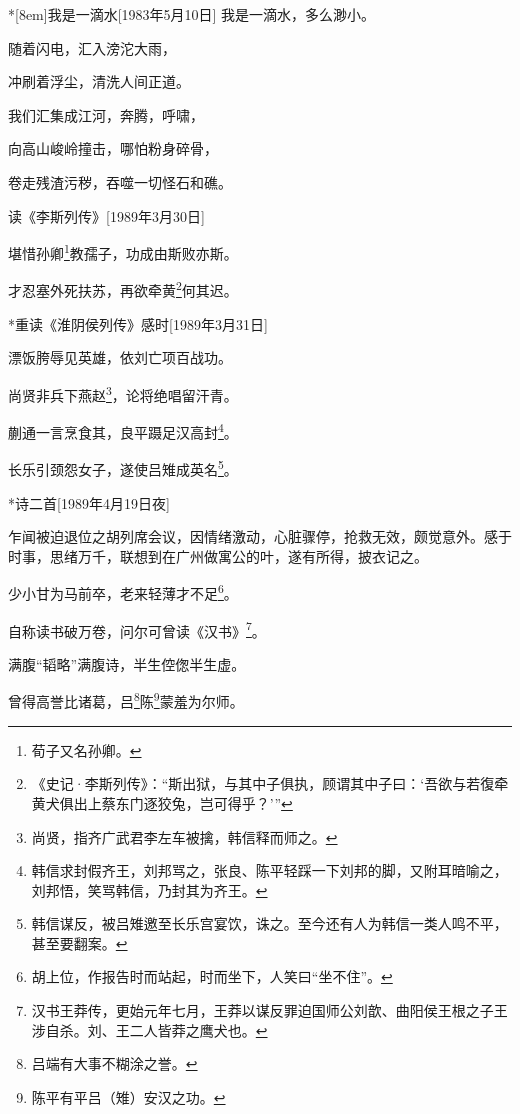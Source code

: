\documentclass[../../dazhuan.tex]{subfiles}
\begin{document}
\begin{poem}*[8em]{我是一滴水}[1983年5月10日]
我是一滴水，多么渺小。

随着闪电，汇入滂沱大雨，

冲刷着浮尘，清洗人间正道。

我们汇集成江河，奔腾，呼啸，

向高山峻岭撞击，哪怕粉身碎骨，

卷走残渣污秽，吞噬一切怪石和礁。
\end{poem}

\begin{poem}{读《李斯列传》}[1989年3月30日]

堪惜孙卿\footnote{荀子又名孙卿。}教孺子，功成由斯败亦斯。

才忍塞外死扶苏，再欲牵黄\footnote{《史记·李斯列传》：“斯出狱，与其中子俱执，顾谓其中子曰：‘吾欲与若復牵黄犬俱出上蔡东门逐狡兔，岂可得乎？’”}何其迟。
\end{poem}

\begin{poem}*{重读《淮阴侯列传》感时}[1989年3月31日]

漂饭胯辱见英雄，依刘亡项百战功。

尚贤非兵下燕赵\footnote{尚贤，指齐广武君李左车被擒，韩信释而师之。}，论将绝唱留汗青。

蒯通一言烹食其，良平蹑足汉高封\footnote{韩信求封假齐王，刘邦骂之，张良、陈平轻踩一下刘邦的脚，又附耳暗喻之，刘邦悟，笑骂韩信，乃封其为齐王。}。

长乐引颈怨女子，遂使吕雉成英名\footnote{韩信谋反，被吕雉邀至长乐宫宴饮，诛之。至今还有人为韩信一类人鸣不平，甚至要翻案。}。
\end{poem}

\begin{poem}*{诗二首}[1989年4月19日夜]
\begin{xpref}
乍闻被迫退位之胡列席会议，因情绪激动，心脏骤停，抢救无效，颇觉意外。感于时事，思绪万千，联想到在广州做寓公的叶，遂有所得，披衣记之。
\end{xpref}

\newpage
\subtitle{一\\悼胡}

少小甘为马前卒，老来轻薄才不足\footnote{胡上位，作报告时而站起，时而坐下，人笑曰“坐不住”。}。

自称读书破万卷，问尔可曾读《汉书》\footnote{汉书王莽传，更始元年七月，王莽以谋反罪迫国师公刘歆、曲阳侯王根之子王涉自杀。刘、王二人皆莽之鹰犬也。}。

\subtitle{二\\忆叶}

满腹“韬略”满腹诗，半生倥偬半生虚。

曾得高誉比诸葛，吕\footnote{吕端有大事不糊涂之誉。}陈\footnote{陈平有平吕（雉）安汉之功。}蒙羞为尔师。
\end{poem}
\end{document}
